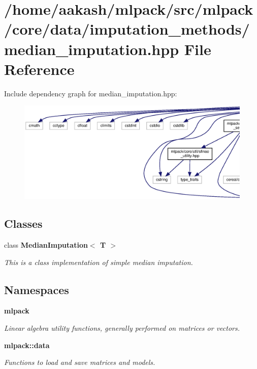 \section{/home/aakash/mlpack/src/mlpack/core/data/imputation\+\_\+methods/median\+\_\+imputation.hpp File Reference}
\label{median__imputation_8hpp}
Include dependency graph for median\+\_\+imputation.\+hpp\+:
\nopagebreak
\begin{figure}[H]
\begin{center}
\leavevmode
\includegraphics[width=350pt]{median__imputation_8hpp__incl}
\end{center}
\end{figure}
\subsection*{Classes}
\begin{DoxyCompactItemize}
\item 
class \textbf{ Median\+Imputation$<$ T $>$}
\begin{DoxyCompactList}\small\item\em This is a class implementation of simple median imputation. \end{DoxyCompactList}\end{DoxyCompactItemize}
\subsection*{Namespaces}
\begin{DoxyCompactItemize}
\item 
 \textbf{ mlpack}
\begin{DoxyCompactList}\small\item\em Linear algebra utility functions, generally performed on matrices or vectors. \end{DoxyCompactList}\item 
 \textbf{ mlpack\+::data}
\begin{DoxyCompactList}\small\item\em Functions to load and save matrices and models. \end{DoxyCompactList}\end{DoxyCompactItemize}


